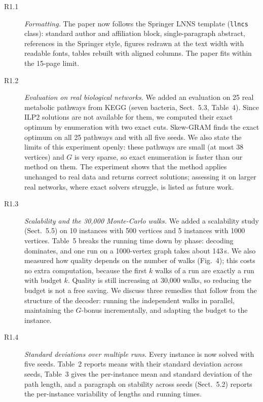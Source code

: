 \begin{description}
\item[R1.1] \emph{Formatting.} The paper now follows the Springer LNNS template (\texttt{llncs} class): standard author and affiliation block, single-paragraph abstract, references in the Springer style, figures redrawn at the text width with readable fonts, tables rebuilt with aligned columns. The paper fits within the 15-page limit.

\item[R1.2] \emph{Evaluation on real biological networks.} We added an evaluation on 25 real metabolic pathways from KEGG (seven bacteria, Sect.~5.3, Table~4). Since ILP2 solutions are not available for them, we computed their exact optimum by enumeration with two exact cuts. Skew-GRAM finds the exact optimum on all 25 pathways and with all five seeds. We also state the limits of this experiment openly: these pathways are small (at most 38 vertices) and $G$ is very sparse, so exact enumeration is faster than our method on them. The experiment shows that the method applies unchanged to real data and returns correct solutions; assessing it on larger real networks, where exact solvers struggle, is listed as future work.

\item[R1.3] \emph{Scalability and the 30,000 Monte-Carlo walks.} We added a scalability study (Sect.~5.5) on 10 instances with 500 vertices and 5 instances with 1000 vertices. Table~5 breaks the running time down by phase: decoding dominates, and one run on a 1000-vertex graph takes about 143\,s. We also measured how quality depends on the number of walks (Fig.~4); this costs no extra computation, because the first $k$ walks of a run are exactly a run with budget $k$. Quality is still increasing at 30,000 walks, so reducing the budget is not a free saving. We discuss three remedies that follow from the structure of the decoder: running the independent walks in parallel, maintaining the $G$-bonus incrementally, and adapting the budget to the instance.

\item[R1.4] \emph{Standard deviations over multiple runs.} Every instance is now solved with five seeds. Table~2 reports means with their standard deviation across seeds, Table~3 gives the per-instance mean and standard deviation of the path length, and a paragraph on stability across seeds (Sect.~5.2) reports the per-instance variability of lengths and running times.
\end{description}

